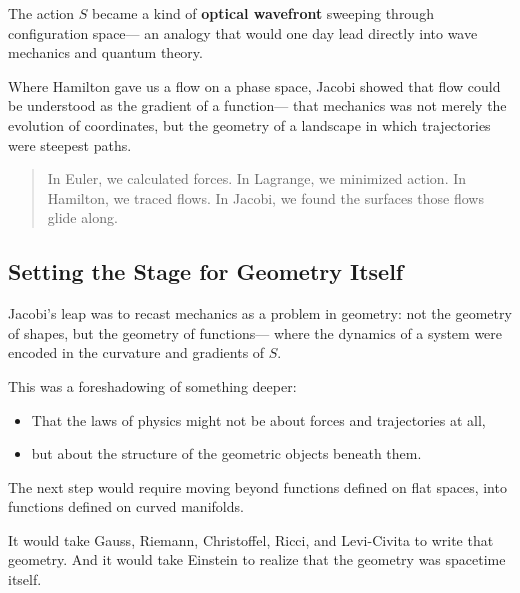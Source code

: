 The action \( S \) became a kind of \textbf{optical wavefront} sweeping through configuration space—  
an analogy that would one day lead directly into wave mechanics and quantum theory.

\bigskip

Where Hamilton gave us a flow on a phase space,  
Jacobi showed that flow could be understood as the gradient of a function—  
that mechanics was not merely the evolution of coordinates, but the geometry of a landscape in which trajectories were steepest paths.

\bigskip

\begin{quote}
In Euler, we calculated forces.  
In Lagrange, we minimized action.  
In Hamilton, we traced flows.  
In Jacobi, we found the surfaces those flows glide along.
\end{quote}

\subsection*{Setting the Stage for Geometry Itself}

Jacobi’s leap was to recast mechanics as a problem in geometry:  
not the geometry of shapes, but the geometry of functions—  
where the dynamics of a system were encoded in the curvature and gradients of \( S \).

This was a foreshadowing of something deeper:

\begin{itemize}
    \item That the laws of physics might not be about forces and trajectories at all,  
    \item but about the structure of the geometric objects beneath them.
\end{itemize}

The next step would require moving beyond functions defined on flat spaces,  
into functions defined on curved manifolds.

It would take Gauss, Riemann, Christoffel, Ricci, and Levi-Civita to write that geometry.  
And it would take Einstein to realize that the geometry was spacetime itself.
